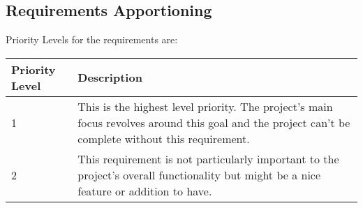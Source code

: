 \subsection{Requirements Apportioning}
Priority Levels for the requirements are:\\
\begin{longtable}{|l|p{10cm}|}
    \hline
    Priority Level & Description \\
    \hline

    1 & This is the highest level priority. The project's main focus revolves around this goal and the project can't be complete without this requirement.\\
    \hline
    2 & This requirement is not particularly important to the project's overall functionality but might be a nice feature or addition to have.\\

    \hline
\end{longtable}
